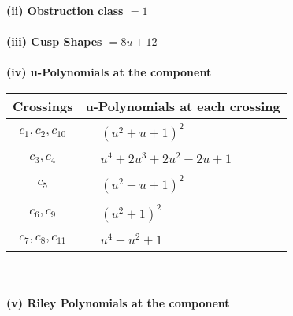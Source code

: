 \documentclass[1p]{elsarticle_modified}
\theoremstyle{definition}
\begin{document}
\flushleft \textbf{(ii) Obstruction class $= 1$}\\~\\
\flushleft \textbf{(iii) Cusp Shapes $= 8 u+12$}\\~\\
\newpage\renewcommand{\arraystretch}{1}
\flushleft \textbf{(iv) u-Polynomials at the component}\newline \\
\begin{tabular}{m{50pt}|m{274pt}}
Crossings & \hspace{64pt}u-Polynomials at each crossing \\
\hline $$\begin{aligned}c_{1},c_{2},c_{10}\end{aligned}$$&$\begin{aligned}
&(u^2+u+1)^2
\end{aligned}$\\
\hline $$\begin{aligned}c_{3},c_{4}\end{aligned}$$&$\begin{aligned}
&u^4+2 u^3+2 u^2-2 u+1
\end{aligned}$\\
\hline $$\begin{aligned}c_{5}\end{aligned}$$&$\begin{aligned}
&(u^2- u+1)^2
\end{aligned}$\\
\hline $$\begin{aligned}c_{6},c_{9}\end{aligned}$$&$\begin{aligned}
&(u^2+1)^2
\end{aligned}$\\
\hline $$\begin{aligned}c_{7},c_{8},c_{11}\end{aligned}$$&$\begin{aligned}
&u^4- u^2+1
\end{aligned}$\\
\hline
\end{tabular}\\~\\
\newpage\renewcommand{\arraystretch}{1}
\flushleft \textbf{(v) Riley Polynomials at the component}\newline \\
\end{document}
